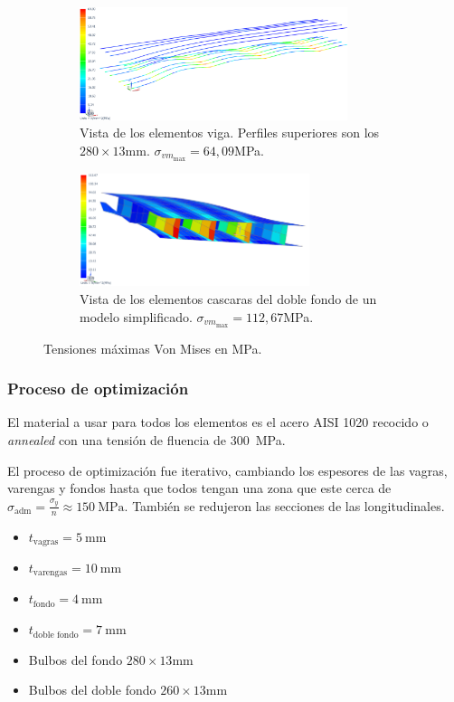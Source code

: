 \documentclass[onecolumn,10pt,titlepage]{article}
\newcommand{\adm}{\textrm{adm}}
\begin{document}
 \begin{figure}[htb!]
 \centering
 \begin{subfigure}{0.49\textwidth}
 \begin{framed}
 \includegraphics[height=3.3cm]{fig/longitudinales_a.png}
 \caption{Vista de los elementos viga. Perfiles superiores son los $280\times 13\si{\milli \meter}$. $\sigma_{vm_{\max}}= 64,09 $\si{\mega \pascal}.}
 \label{fig:longitudinalesCasoA}
 \end{framed}
 \end{subfigure}
 \begin{subfigure}{0.49\textwidth}
 \begin{framed}
 \includegraphics[height=3.3cm]{fig/varengas_a.png}
 \caption{Vista de los elementos cascaras del doble fondo de un modelo simplificado. $\sigma_{vm_{\max}}= 112,67 $\si{\mega \pascal}.}
 \label{fig:VarengasCasoA}
 \end{framed}
 \end{subfigure}
 \caption{Tensiones máximas Von Mises en \si{\mega \pascal}.}
 \label{fig:2a}
 \end{figure}

\subsubsection*{Proceso de optimización}
El material a usar para todos los elementos es el acero AISI 1020 recocido o \emph{annealed} con una tensión de fluencia de \SI{300}{\mega \pascal}.

El proceso de optimización fue iterativo, cambiando los espesores de las vagras, varengas y fondos hasta que todos tengan una zona que este cerca de $\sigma_{\adm}=\frac{\sigma_{y}}{n}\approx\SI{150}{\mega \pascal}$. También se redujeron las secciones de las longitudinales.
\begin{itemize}
	\item $t_{\textrm{vagras}}=\SI{5}{\milli \meter}$
	\item $t_{\textrm{varengas}}=\SI{10}{\milli \meter}$
	\item $t_{\textrm{fondo}}=\SI{4}{\milli \meter}$
	\item $t_{\textrm{doble fondo}}=\SI{7}{\milli \meter}$
	\item Bulbos del fondo $280\times 13$\si{\milli \meter}
	\item Bulbos del doble fondo $260\times 13$\si{\milli \meter}
\end{itemize}
\end{document}
